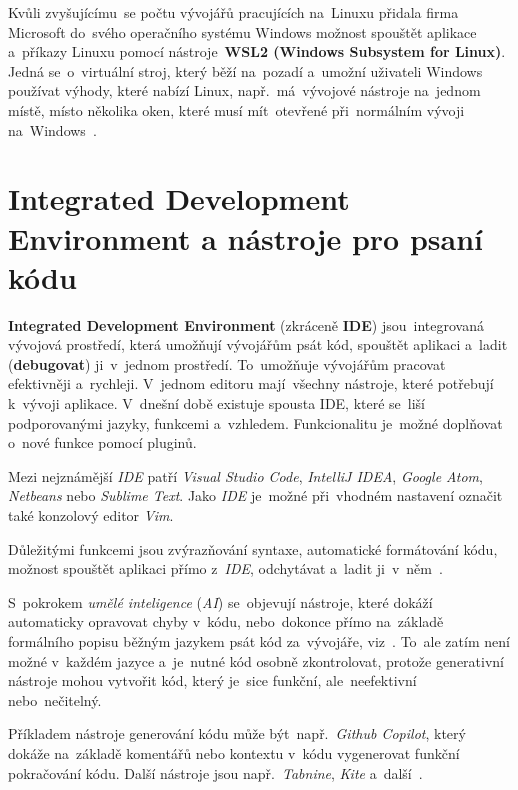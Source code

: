 \documentclass[11pt,a4paper]{report}
\begin{document}
            Kvůli zvyšujícímu~se počtu vývojářů pracujících na~Linuxu přidala firma Microsoft do~svého operačního systému Windows možnost spouštět aplikace a~příkazy Linuxu pomocí nástroje~\textbf{WSL2 (Windows Subsystem for Linux)}. Jedná se~o~virtuální stroj, který běží na~pozadí a~umožní uživateli Windows používat výhody, které nabízí Linux, např.~má~vývojové nástroje na~jednom místě, místo několika oken, které musí mít~otevřené při~normálním vývoji na~Windows~\cite{WSL2Winning2023}.

        \section{Integrated Development Environment a nástroje pro psaní kódu}
            \textbf{Integrated Development Environment} (zkráceně \textbf{IDE}) jsou~integrovaná vývojová prostředí, která umožňují vývojářům psát kód, spouštět aplikaci a~ladit (\textbf{debugovat}) ji~v~jednom prostředí. To~umožňuje vývojářům pracovat efektivněji a~rychleji. V~jednom editoru mají~všechny nástroje, které potřebují k~vývoji aplikace. V~dnešní době existuje spousta IDE, které se~liší podporovanými jazyky, funkcemi a~vzhledem. Funkcionalitu je~možné doplňovat o~nové funkce pomocí pluginů.
            
            Mezi nejznámější \emph{IDE} patří \emph{Visual Studio Code}, \emph{IntelliJ IDEA}, \emph{Google Atom}, \emph{Netbeans} nebo \emph{Sublime Text}. Jako \emph{IDE} je~možné při~vhodném nastavení označit také konzolový editor \emph{Vim}.
            
            Důležitými funkcemi jsou zvýrazňování syntaxe, automatické formátování kódu, možnost spouštět aplikaci přímo z~\emph{IDE}, odchytávat a~ladit ji~v~něm~\cite{IDE}.
            
            S~pokrokem \emph{umělé inteligence} (\emph{AI}) se~objevují nástroje, které dokáží automaticky opravovat chyby v~kódu, nebo~dokonce přímo na~základě formálního popisu běžným jazykem psát kód za~vývojáře, viz~\cite{pasek:generovanizdroju}. To~ale zatím není možné v~každém jazyce a~je~nutné kód osobně zkontrolovat, protože generativní nástroje mohou vytvořit kód, který je~sice funkční, ale~neefektivní nebo~nečitelný.

            Příkladem nástroje generování kódu může být~např.~\emph{Github Copilot}, který dokáže na~základě komentářů nebo kontextu v~kódu vygenerovat funkční pokračování kódu. Další nástroje jsou např.~\emph{Tabnine}, \emph{Kite} a~další~\cite{sz:AI}.
            
\end{document}
